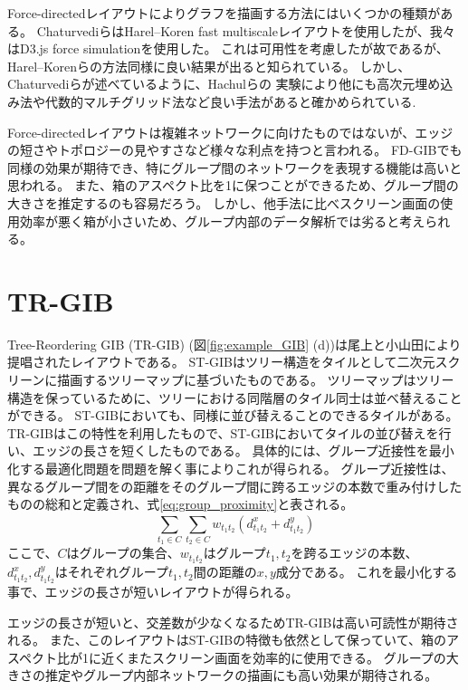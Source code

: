 \documentclass{kuee}
\begin{document}
Force-directedレイアウトによりグラフを描画する方法にはいくつかの種類がある。
ChaturvediらはHarel--Koren fast multiscaleレイアウト\cite{harel2002graph}を使用したが、我々はD3.js force simulation\cite{Bostock:2011:DDD:2068462.2068631}を使用した。
これは可用性を考慮したが故であるが、Harel--Korenらの方法同様に良い結果が出ると知られている。
しかし、Chaturvediらが述べているように\cite{chaturvedi2014group}、Hachulらの
実験\cite{Hachul:2005:ECF:2102325.2102348}により他にも高次元埋め込み法\cite{harel2002graph}や代数的マルチグリッド法\cite{koren2003drawing}など良い手法があると確かめられている.

Force-directedレイアウトは複雑ネットワークに向けたものではないが、エッジの短さやトポロジーの見やすさなど様々な利点を持つと言われる\cite{Kobourov2013ForceDirectedDA}。
FD-GIBでも同様の効果が期待でき、特にグループ間のネットワークを表現する機能は高いと思われる。
また、箱のアスペクト比を1に保つことができるため、グループ間の大きさを推定するのも容易だろう。
しかし、他手法に比べスクリーン画面の使用効率が悪く箱が小さいため、グループ内部のデータ解析では劣ると考えられる。

\section{TR-GIB}
Tree-Reordering GIB (TR-GIB) (図\ref{fig:example_GIB} (d))は尾上と小山田により提唱されたレイアウトである。
ST-GIBはツリー構造をタイルとして二次元スクリーンに描画するツリーマップに基づいたものである。
ツリーマップはツリー構造を保っているために、ツリーにおける同階層のタイル同士は並べ替えることができる。
ST-GIBにおいても、同様に並び替えることのできるタイルがある。
TR-GIBはこの特性を利用したもので、ST-GIBにおいてタイルの並び替えを行い、エッジの長さを短くしたものである。
具体的には、グループ近接性を最小化する最適化問題を問題を解く事によりこれが得られる。
グループ近接性は、異なるグループ間をの距離をそのグループ間に跨るエッジの本数で重み付けしたものの総和と定義され、式\ref{eq:group_proximity}と表される。
\begin{equation}
\label{eq:group_proximity}
  \sum_{t_1 \in C}^{} \sum_{t_2 \in C}^{} w_{t_1 t_2}(d_{t_1 t_2}^x + d_{t_1 t_2}^y)
\end{equation}
ここで、$C$はグループの集合、$w_{t_1 t_2}$はグループ$t_1, t_2$を跨るエッジの本数、$d_{t_1 t_2}^x, d_{t_1 t_2}^y$はそれぞれグループ$t_1, t_2$間の距離の$x, y$成分である。
これを最小化する事で、エッジの長さが短いレイアウトが得られる。

エッジの長さが短いと、交差数が少なくなるためTR-GIBは高い可読性が期待される。
また、このレイアウトはST-GIBの特徴も依然として保っていて、箱のアスペクト比が1に近くまたスクリーン画面を効率的に使用できる。
グループの大きさの推定やグループ内部ネットワークの描画にも高い効果が期待される。
\end{document}
